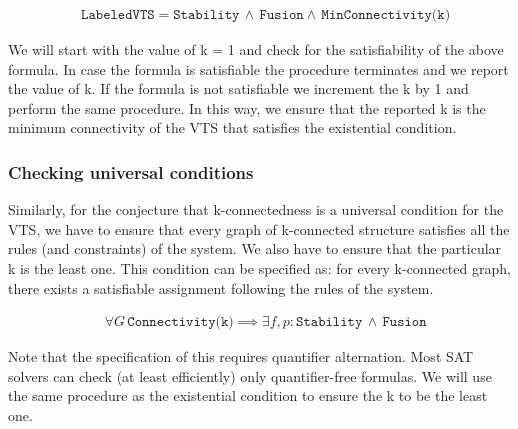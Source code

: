 \begin{align*}
  &\texttt{LabeledVTS} = \texttt{Stability} \, \land \, \texttt{Fusion} \land \, \texttt{MinConnectivity(k)} 
\end{align*}

We will start with the value of k = 1 and check for the satisfiability of the above formula.
%
In case the formula is satisfiable the procedure terminates and we report the value of k. 
%
If the formula is not satisfiable we increment the k by 1 and perform the same procedure. 
%
In this way, we ensure that the reported k is the minimum connectivity of the VTS that satisfies the existential condition.  

\subsubsection{Checking universal conditions}

Similarly, for the conjecture that k-connectedness is a universal condition for the VTS, we have to ensure that every graph of k-connected structure satisfies all the rules (and constraints) of the system. 
%
We also have to ensure that the particular k is the least one. 
%
This condition can be specified as: for every k-connected graph, there exists a satisfiable assignment following the rules of the system. 

\begin{align*}
  & \forall G \, \texttt{Connectivity(k)} \implies  \exists
                        f,p: \texttt{Stability} \, \land \, \texttt{Fusion}  
\end{align*}

Note that the specification of this requires quantifier alternation. 
%
Most SAT solvers can check (at least efficiently) only quantifier-free formulas. 
%
We will use the same procedure as the existential condition to ensure the k to be the least one.



          
